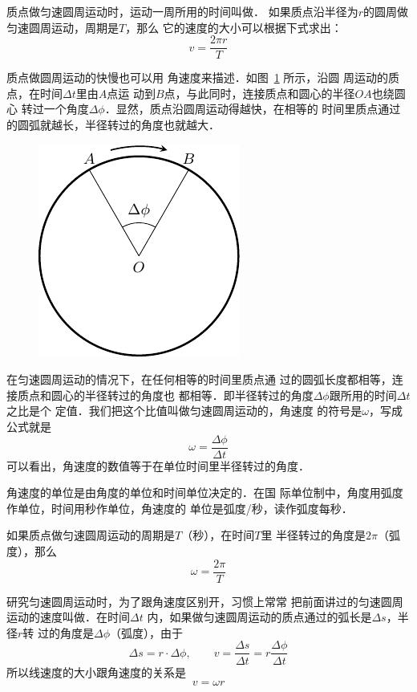     质点做匀速圆周运动时，运动一周所用的时间叫做．
如果质点沿半径为$r$的圆周做匀速圆周运动，周期是$T$，那么
它的速度的大小可以根据下式求出：
\begin{equation}\label{eq_A_4-1}
v=\frac{2\pi r}{T}
\end{equation}

    质点做圆周运动的快慢也可以用
角速度来描述．如图~\ref{fig_A_4-16} 所示，沿圆
周运动的质点，在时间$\Delta t$里由$A$点运
动到$B$点，与此同时，连接质点和圆心的半径$OA$也绕圆心
转过一个角度$\Delta \phi$．显然，质点沿圆周运动得越快，在相等的
时间里质点通过的圆弧就越长，半径转过的角度也就越大．

\begin{figure}[htbp]
    \centering
    \includegraphics{fig/A/4-16.pdf}
    \caption{}\label{fig_A_4-16}
\end{figure}

    在匀速圆周运动的情况下，在任何相等的时间里质点通
过的圆弧长度都相等，连接质点和圆心的半径转过的角度也
都相等．即半径转过的角度$\Delta \phi$跟所用的时间$\Delta t$之比是个
定值．我们把这个比值叫做匀速圆周运动的，角速度
的符号是$\omega$，写成公式就是
\[\omega=\frac{\Delta \phi}{\Delta t}\]
可以看出，角速度的数值等于在单位时间里半径转过的角度．

    角速度的单位是由角度的单位和时间单位决定的．在国
际单位制中，角度用弧度作单位，时间用秒作单位，角速度的
单位是弧度/秒，读作弧度每秒．

    如果质点做匀速圆周运动的周期是$T$（秒），在时间$T$里
半径转过的角度是$2\pi$（弧度），那么
\begin{equation}\label{eq_A_4-2}
\omega=\frac{2\pi}{T}
\end{equation}

    研究匀速圆周运动时，为了跟角速度区别开，习惯上常常
把前面讲过的匀速圆周运动的速度叫做．在时间$\Delta t$
内，如果做匀速圆周运动的质点通过的弧长是$\Delta s$，半径$r$转
过的角度是$\Delta \phi$（弧度），由于
\[\Delta s=r\cdot \Delta \phi, \qquad v=\frac{\Delta s}{\Delta t}=r\frac{\Delta \phi}{\Delta t} \]
所以线速度的大小跟角速度的关系是
\begin{equation}\label{eq_A_4-3}
v=\omega r
\end{equation}

